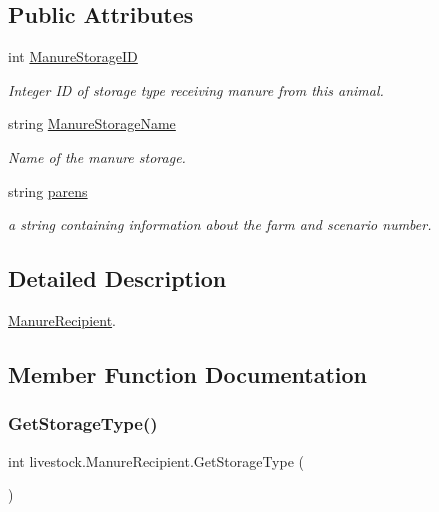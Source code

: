\subsection*{Public Attributes}
\begin{DoxyCompactItemize}
\item 
int \mbox{\hyperlink{structlivestock_1_1_manure_recipient_a994ca499b2863c95705832269c31a4c0}{Manure\+Storage\+ID}}
\begin{DoxyCompactList}\small\item\em Integer ID of storage type receiving manure from this animal. \end{DoxyCompactList}\item 
string \mbox{\hyperlink{structlivestock_1_1_manure_recipient_a7a2d6c5743a5b9ab2686c43a3127042e}{Manure\+Storage\+Name}}
\begin{DoxyCompactList}\small\item\em Name of the manure storage. \end{DoxyCompactList}\item 
string \mbox{\hyperlink{structlivestock_1_1_manure_recipient_adb66d99bb1b3cf89215d89acca36d3e2}{parens}}
\begin{DoxyCompactList}\small\item\em a string containing information about the farm and scenario number. \end{DoxyCompactList}\end{DoxyCompactItemize}


\subsection{Detailed Description}
\mbox{\hyperlink{structlivestock_1_1_manure_recipient}{Manure\+Recipient}}. 

\subsection{Member Function Documentation}
\mbox{\label{structlivestock_1_1_manure_recipient_a0c22336e1afb2d95c77579e6058c3eb4}} 
\subsubsection{\texorpdfstring{GetStorageType()}{GetStorageType()}}
{\footnotesize\ttfamily int livestock.\+Manure\+Recipient.\+Get\+Storage\+Type (\begin{DoxyParamCaption}{ }\end{DoxyParamCaption})\hspace{0.3cm}{\ttfamily [inline]}}

